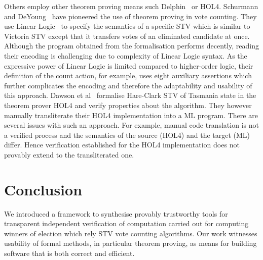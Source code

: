 \documentclass[10pt,conference]{IEEEtran}
\begin{document}
Others employ other theorem proving means such Delphin~\cite{Dolphin} or HOL4. Schurmann and DeYoung~\cite{DeYoung:2012:LLV} have pioneered the use of theorem proving in vote counting. They use Linear Logic~\cite{DBLP:journals/apal/Girard93} to specify the semantics of a specific STV which is similar to Victoria STV except that it transfers votes of an eliminated candidate at once. Although the program obtained from the formalisation performs decently, reading their encoding is challenging due to complexity of Linear Logic syntax. As the expressive power of Linear Logic is limited compared to higher-order logic, their definition of the count action, for example, uses eight auxiliary assertions which further complicates
the encoding and therefore the adaptability and usability of this approach.  Dawson et al~\cite{DBLP:conf/voteid/DawsonGM15} formalise Hare-Clark STV of Tasmania state in the theorem prover HOL4 and verify properties about the algorithm. They however manually transliterate their  HOL4 implementation into a ML program. There are several issues with such an approach. For example, manual code translation is not a verified process and the semantics of the source (HOL4) and
the target (ML) differ. Hence verification established for the HOL4 implementation does not provably extend to the
transliterated one.

\section{Conclusion}
We introduced a framework to synthesise provably trustworthy tools for transparent independent verification of computation carried out for computing winners of election which rely STV  vote counting algorithms. Our work witnesses usability of formal methods, in particular theorem proving, as means for building software that is both correct and efficient.
\end{document}
